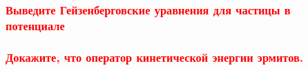 \subsubsection{\textcolor{red} {Выведите Гейзенберговские уравнения для частицы в потенциале}}

\subsubsection{\textcolor{red} {Докажите, что оператор кинетической энергии эрмитов.}}